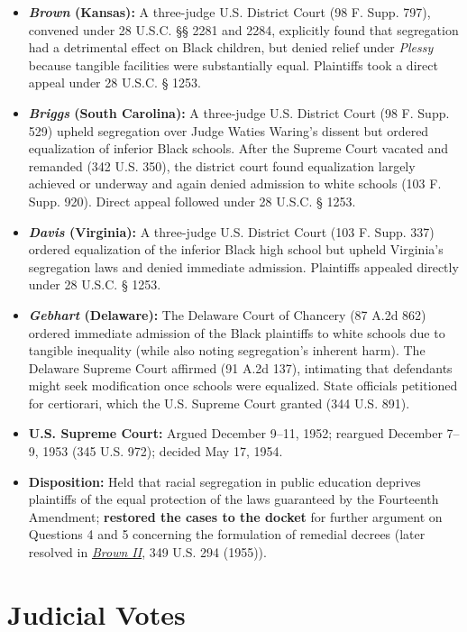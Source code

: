\documentclass[12pt]{article}
\begin{document}
\begin{itemize}
  \item \textbf{\textit{Brown} (Kansas):} A three-judge U.S. District Court (98 F. Supp. 797), convened under 28 U.S.C. \S{}\S{} 2281 and 2284, explicitly found that segregation had a detrimental effect on Black children, but denied relief under \textit{Plessy} because tangible facilities were substantially equal. Plaintiffs took a direct appeal under 28 U.S.C. \S{} 1253.
  \item \textbf{\textit{Briggs} (South Carolina):} A three-judge U.S. District Court (98 F. Supp. 529) upheld segregation over Judge Waties Waring's dissent but ordered equalization of inferior Black schools. After the Supreme Court vacated and remanded (342 U.S. 350), the district court found equalization largely achieved or underway and again denied admission to white schools (103 F. Supp. 920). Direct appeal followed under 28 U.S.C. \S{} 1253.
  \item \textbf{\textit{Davis} (Virginia):} A three-judge U.S. District Court (103 F. Supp. 337) ordered equalization of the inferior Black high school but upheld Virginia's segregation laws and denied immediate admission. Plaintiffs appealed directly under 28 U.S.C. \S{} 1253.
  \item \textbf{\textit{Gebhart} (Delaware):} The Delaware Court of Chancery (87 A.2d 862) ordered immediate admission of the Black plaintiffs to white schools due to tangible inequality (while also noting segregation's inherent harm). The Delaware Supreme Court affirmed (91 A.2d 137), intimating that defendants might seek modification once schools were equalized. State officials petitioned for certiorari, which the U.S. Supreme Court granted (344 U.S. 891).
  \item \textbf{U.S. Supreme Court:} Argued December 9--11, 1952; reargued December 7--9, 1953 (345 U.S. 972); decided May 17, 1954.
  \item \textbf{Disposition:} Held that racial segregation in public education deprives plaintiffs of the equal protection of the laws guaranteed by the Fourteenth Amendment; \textbf{restored the cases to the docket} for further argument on Questions 4 and 5 concerning the formulation of remedial decrees (later resolved in \href{https://supreme.justia.com/cases/federal/us/349/294/}{\textit{Brown II}}, 349 U.S. 294 (1955)).
\end{itemize}

\section{Judicial Votes}
\end{document}
